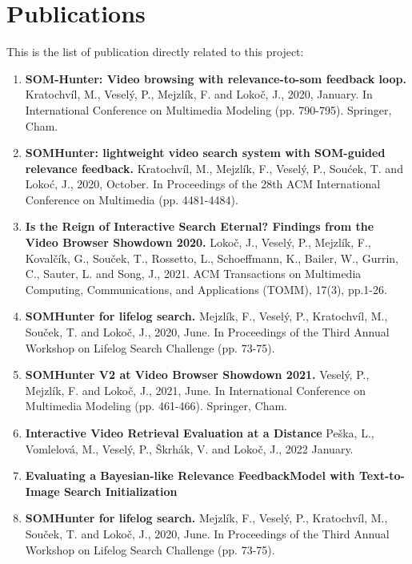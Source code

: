 \section{Publications}
This is the list of publication directly related to this project:
\begin{enumerate}
	\item \textbf{SOM-Hunter: Video browsing with relevance-to-som feedback loop.} Kratochvíl, M., Veselý, P., Mejzlík, F. and Lokoč, J., 2020, January. In International Conference on Multimedia Modeling (pp. 790-795). Springer, Cham.
	\item \textbf{SOMHunter: lightweight video search system with SOM-guided relevance feedback.} Kratochvíl, M., Mejzlík, F., Veselý, P., Soućek, T. and Lokoć, J., 2020, October. In Proceedings of the 28th ACM International Conference on Multimedia (pp. 4481-4484).
	\item \textbf{Is the Reign of Interactive Search Eternal? Findings from the Video Browser Showdown 2020.} Lokoč, J., Veselý, P., Mejzlík, F., Kovalčík, G., Souček, T., Rossetto, L., Schoeffmann, K., Bailer, W., Gurrin, C., Sauter, L. and Song, J., 2021.  ACM Transactions on Multimedia Computing, Communications, and Applications (TOMM), 17(3), pp.1-26.
	\item \textbf{SOMHunter for lifelog search.} Mejzlík, F., Veselý, P., Kratochvíl, M., Souček, T. and Lokoč, J., 2020, June. In Proceedings of the Third Annual Workshop on Lifelog Search Challenge (pp. 73-75).
	\item \textbf{SOMHunter V2 at Video Browser Showdown 2021.} Veselý, P., Mejzlík, F. and Lokoč, J., 2021, June. In International Conference on Multimedia Modeling (pp. 461-466). Springer, Cham.
	\item \textbf{Interactive Video Retrieval Evaluation at a Distance} Peška, L., Vomlelová, M., Veselý, P., Škrhák, V. and Lokoč, J., 2022 January.
	\item \textbf{Evaluating a Bayesian-like Relevance FeedbackModel with Text-to-Image Search Initialization} 
	\item \textbf{SOMHunter for lifelog search.} Mejzlík, F., Veselý, P., Kratochvíl, M., Souček, T. and Lokoč, J., 2020, June. In Proceedings of the Third Annual Workshop on Lifelog Search Challenge (pp. 73-75).
\end{enumerate}
